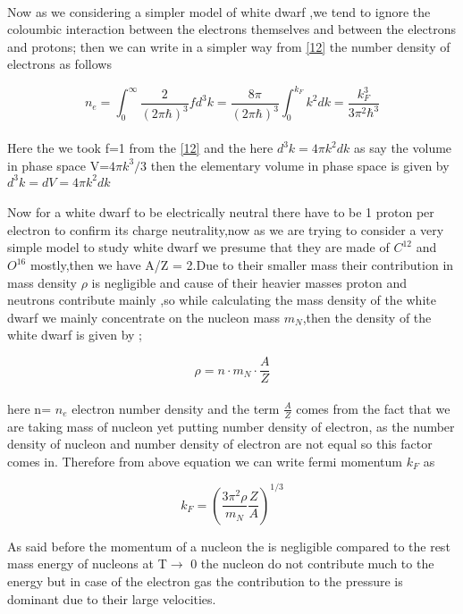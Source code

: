 \documentclass{report}
\begin{document}
\paragraph{ }
Now as we considering a simpler model of  white dwarf ,we tend to ignore the coloumbic interaction between the electrons themselves and between the electrons and protons; then we can write in a simpler way from \ref{12} the number density of electrons as follows
\begin{center}
\begin{equation}
n_e = \int_0 ^{\infty} \frac{2}{\left(2\pi\hbar\right)^3} fd^3k 
    = \frac{8\pi}{(2\pi\hbar)^3}\int_0 ^{k_F} k^2dk
    = \frac{k_F^3}{3\pi ^2 \hbar ^3}
\label{13}
\end{equation}
\end{center}
\paragraph{ }
Here the we took f=1 from the \ref{12} and the here $d^3k = 4\pi k^2 dk$ as say the volume in phase space V=$4\pi k^3 /3$ then the elementary volume in phase space is given by $d^3 k = dV = 4\pi k^2 dk$
\paragraph{ }
Now for a white dwarf to be electrically neutral there have to be 1 proton per electron to confirm its charge neutrality,now as we are trying to consider a very simple model to study white dwarf we presume that they are made of $C^{12}$ and $O^{16}$ mostly,then we have A/Z = 2.Due to their smaller mass their contribution in mass density $\rho $ is negligible and cause of their heavier masses proton and neutrons contribute mainly ,so while calculating the mass density of the white dwarf we mainly concentrate on the nucleon mass $m_N$,then the density of the white dwarf is given by ;
\begin{center}
\begin{equation}
\rho = n \cdot m_N \cdot \frac{A}{Z}
\label{14}
\end{equation}
\end{center}
\paragraph{ }
here n= $n_e$ electron number density and the term $\frac{A}{Z}$ comes from the fact that we are taking mass of nucleon yet putting number density of electron, as the number density of nucleon and number density of electron are not equal so this factor comes in. Therefore  from above equation we can write fermi momentum $k_F$ as
\begin{center}
\begin{equation}
k_F = \left( \frac{3\pi ^2 \rho}{m_N} \frac{Z}{A} \right)^{1/3}
\label{15}
\end{equation}
\end{center}
As said before the momentum of a nucleon the is negligible compared to the rest mass energy of nucleons at T$\rightarrow$ 0 the nucleon do not contribute much to the energy but in case of the electron gas the contribution to the pressure is dominant due to their large velocities.
\newpage
\end{document}
